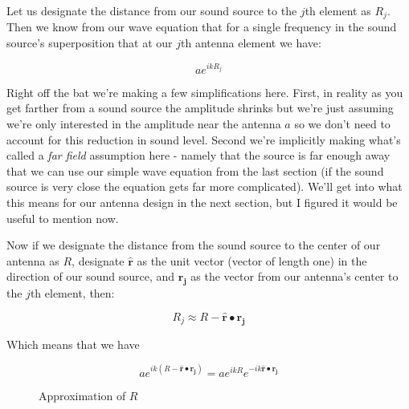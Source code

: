 \documentclass[10pt,a4paper]{article}
\begin{document}
Let us designate the distance from our sound source to the $j$th element as $R_j$. Then we know from our wave equation that for a single frequency in the sound source's superposition that at our $j$th antenna element we have:

\begin{equation}
a e^{ikR_j}
\end{equation}

Right off the bat we're making a few simplifications here. First, in reality as you get farther from a sound source the amplitude shrinks but we're just assuming we're only interested in the amplitude near the antenna $a$ so we don't need to account for this reduction in sound level. Second we're implicitly making what's called a \textit{far field} assumption here - namely that the source is far enough away that we can use our simple wave equation from the last section (if the sound source is very close the equation gets far more complicated). We'll get into what this means for our antenna design in the next section, but I figured it would be useful to mention now. 

Now if we designate the distance from the sound source to the center of our antenna as $R$, designate $\mathbf{\hat{r}}$ as the unit vector (vector of length one) in the direction of our sound source, and $\mathbf{r_j}$ as the vector from our antenna's center to the $j$th element, then:

\begin{equation}
R_j \approx R - \mathbf{\hat{r}}\bullet\mathbf{r_j}
\end{equation}

Which means that we have

\begin{equation}
a e^{ik(R - \mathbf{\hat{r}}\bullet\mathbf{r_j})} = ae^{ikR}e^{-ik\mathbf{\hat{r}}\bullet\mathbf{r_j}}
\end{equation}

\begin{figure}[!htb]
\caption{\label{fig:my-label} Approximation of $R$}
\end{figure}
\end{document}
